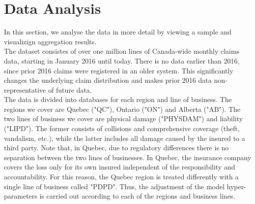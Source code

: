\section{Data Analysis}\label{Section_dataAnalysis}
In this section, we analyse the data in more detail by viewing a sample and visualizign aggregation results.\\

The dataset consistes of over one million lines of Canada-wide monthly claims data, starting in January 2016 until today. There is no data earlier than 2016, since prior 2016 claims were registered in an older system. This significantly changes the underlying claim distribution and makes prior 2016 data non-representative of future data.\\
The data is divided into databases for each region and line of business. The regions we cover are Quebec ("QC"), Ontario ("ON") and Alberta ("AB"). The two lines of business we cover are physical damage ("PHYSDAM") and liability ("LIPD"). The former consists of collisions and comprehensive coverage (theft, vandalism, etc.), while the latter includes all damage caused by the insured to a third party. Note that, in Quebec, due to regulatory differences there is no separation between the two lines of businesses. In Quebec, the insurance company covers the loss only for its own insured independent of the responsibility and accountability. For this reason, the Quebec region is treated differently with a single line of business called "PDPD". Thus, the adjustment of the model hyper-parameters is carried out according to each of the regions and business lines. \\

